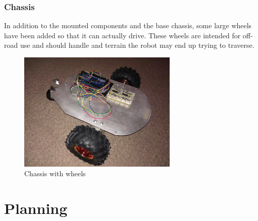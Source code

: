 \documentclass[11pt,fleqn,twoside]{article}
\begin{document}
\subsubsection{Chassis}
In addition to the mounted components and the base chassis, some large wheels have been added so that it can actually drive.  These wheels are intended for off-road use and should handle and terrain the robot may end up trying to traverse.
\begin{figure}[h]
\centering
        \includegraphics[width=3.0in] {figures/tria-mkII.jpg}
        \caption{Chassis with wheels}
        \label{Chassis with wheels}
\end{figure}


\section{Planning}
\end{document}
